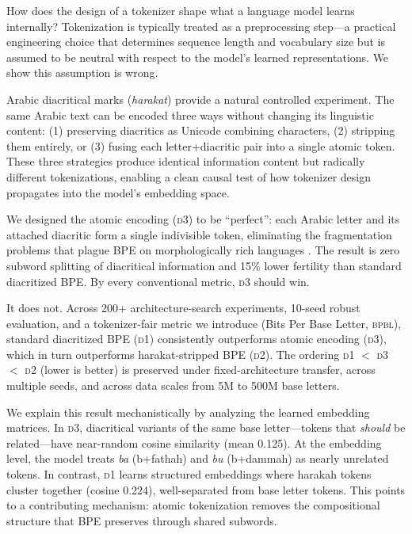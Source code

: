 \documentclass[11pt]{article}
\newcommand{\dOne}{\textsc{d1}}
\newcommand{\dTwo}{\textsc{d2}}
\newcommand{\dThree}{\textsc{d3}}
\newcommand{\bpbl}{\textsc{bpbl}}
\begin{document}
How does the design of a tokenizer shape what a language model learns internally?
Tokenization is typically treated as a preprocessing step---a practical engineering choice that determines sequence length and vocabulary size but is assumed to be neutral with respect to the model's learned representations.
We show this assumption is wrong.

Arabic diacritical marks (\emph{harakat}) provide a natural controlled experiment.
The same Arabic text can be encoded three ways without changing its linguistic content: (1) preserving diacritics as Unicode combining characters, (2) stripping them entirely, or (3) fusing each letter+diacritic pair into a single atomic token.
These three strategies produce identical information content but radically different tokenizations, enabling a clean causal test of how tokenizer design propagates into the model's embedding space.

We designed the atomic encoding (\dThree{}) to be ``perfect'': each Arabic letter and its attached diacritic form a single indivisible token, eliminating the fragmentation problems that plague BPE on morphologically rich languages \cite{rust-etal-2021-good}.
The result is zero subword splitting of diacritical information and 15\% lower fertility than standard diacritized BPE.
By every conventional metric, \dThree{} should win.

It does not.
Across 200+ architecture-search experiments, 10-seed robust evaluation, and a tokenizer-fair metric we introduce (Bits Per Base Letter, \bpbl{}), standard diacritized BPE (\dOne{}) consistently outperforms atomic encoding (\dThree{}), which in turn outperforms harakat-stripped BPE (\dTwo{}).
The ordering \dOne{} $<$ \dThree{} $<$ \dTwo{} (lower is better) is preserved under fixed-architecture transfer, across multiple seeds, and across data scales from 5M to 500M base letters.

We explain this result mechanistically by analyzing the learned embedding matrices.
In \dThree{}, diacritical variants of the same base letter---tokens that \emph{should} be related---have near-random cosine similarity (mean 0.125).
At the embedding level, the model treats \emph{ba} (b+fathah) and \emph{bu} (b+dammah) as nearly unrelated tokens.
In contrast, \dOne{} learns structured embeddings where harakah tokens cluster together (cosine 0.224), well-separated from base letter tokens.
This points to a contributing mechanism: atomic tokenization removes the compositional structure that BPE preserves through shared subwords.
\end{document}
